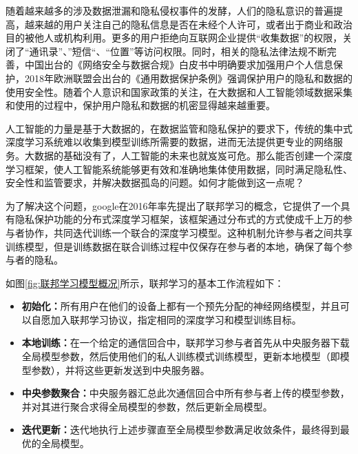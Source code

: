 随着越来越多的涉及数据泄漏和隐私侵权事件的发酵，人们的隐私意识的普遍提高，越来越的用户关注自己的隐私信息是否在未经个人许可，或者出于商业和政治目的被他人或机构利用。更多的用户拒绝向互联网企业提供“收集数据”的权限，关闭了“通讯录”、”短信“、“位置”等访问权限。同时，相关的隐私法律法规不断完善，中国出台的《网络安全与数据合规》白皮书中明确要求加强用户个人信息保护，2018年欧洲联盟会出台的《通用数据保护条例》强调保护用户的隐私和数据的使用安全性。随着个人意识和国家政策的关注，在大数据和人工智能领域数据采集和使用的过程中，保护用户隐私和数据的机密显得越来越重要。

人工智能的力量是基于大数据的，在数据监管和隐私保护的要求下，传统的集中式深度学习系统难以收集到模型训练所需要的数据，进而无法提供更专业的网络服务。大数据的基础没有了，人工智能的未来也就岌岌可危。那么能否创建一个深度学习框架，使人工智能系统能够更有效和准确地集体使用数据，同时满足隐私性、安全性和监管要求，并解决数据孤岛的问题。如何才能做到这一点呢？

为了解决这个问题，google在2016年率先提出了联邦学习的概念，它提供了一个具有隐私保护功能的分布式深度学习框架，该框架通过分布式的方式使成千上万的参与者协作，共同迭代训练一个联合的深度学习模型。这种机制允许参与者之间共享训练模型，但是训练数据在联合训练过程中仅保存在参与者的本地，确保了每个参与者的隐私。

如图\ref{fig:联邦学习模型概况}所示，联邦学习的基本工作流程如下：
\begin{itemize}
\item \textbf{初始化：}所有用户在他们的设备上都有一个预先分配的神经网络模型，并且可以自愿加入联邦学习协议，指定相同的深度学习和模型训练目标。
\item  \textbf{本地训练：}在一个给定的通信回合中，联邦学习参与者首先从中央服务器下载全局模型参数，然后使用他们的私人训练模式训练模型，更新本地模型（即模型参数），并将这些更新发送到中央服务器。
\item \textbf{中央参数聚合：}中央服务器汇总此次通信回合中所有参与者上传的模型参数，并对其进行聚合求得全局模型的参数，然后更新全局模型。
\item \textbf{迭代更新：}迭代地执行上述步骤直至全局模型参数满足收敛条件，最终得到最优的全局模型。
\end{itemize}

